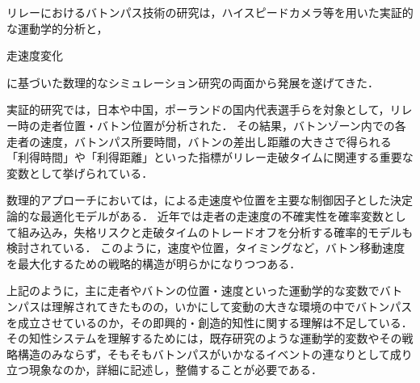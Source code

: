 \documentclass{jsai2e}
\newif\ifshowlabels
\newcommand{\tagtext}[3]{%
  \ifshowlabels
    \textcolor{#1}{#3\textsuperscript{\textsf{[#2]}}}%
  \else
    #3%
  \fi
}
\newcommand{\furu}[2]{\tagtext{furu}{#1}{#2}}
\begin{document}

リレーにおけるバトンパス技術の研究は，ハイスピードカメラ等を用いた実証的な運動学的分析\cite{li2025,matsubayashi2022,zarebska2021}と，\furu{}{走速度変化}に基づいた数理的なシミュレーション研究\cite{karlsson2024,wardsmith2002}の両面から発展を遂げてきた．

\furu{}{
実証的研究では，日本や中国，ポーランドの国内代表選手らを対象として，リレー時の走者位置・バトン位置が分析された．
その結果，バトンゾーン内での各走者の速度，バトンパス所要時間，バトンの差出し距離の大きさで得られる「利得時間」や「利得距離」といった指標がリレー走破タイムに関連する重要な変数として挙げられている\cite{li2025,matsubayashi2022,zarebska2021}．
}
数理的アプローチにおいては，\cite{wardsmith2002}による走速度や位置を主要な制御因子とした決定論的な最適化モデルがある．
近年では走者の走速度の不確実性を確率変数として組み込み，失格リスクと走破タイムのトレードオフを分析する確率的モデルも検討されている\cite{karlsson2024}．
このように，速度や位置，タイミングなど，バトン移動速度を最大化するための戦略的構造が明らかになりつつある．

上記のように，主に走者やバトンの位置・速度といった運動学的な変数でバトンパスは理解されてきたものの，いかにして変動の大きな環境の中でバトンパスを成立させているのか，その即興的・創造的知性に関する理解は不足している．
その知性システムを理解するためには，既存研究のような運動学的変数やその戦略構造のみならず，そもそもバトンパスがいかなるイベントの連なりとして成り立つ現象なのか，詳細に記述し，整備することが必要である．
\end{document}

